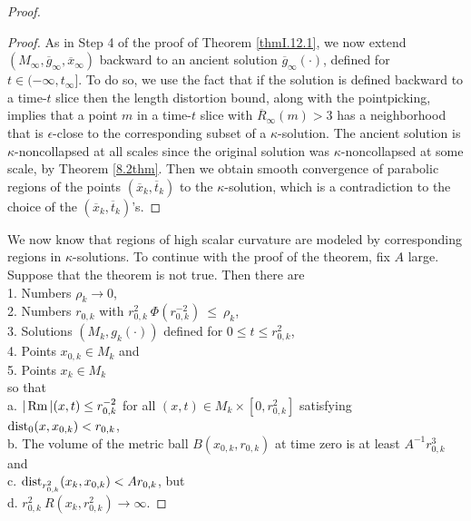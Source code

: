 \begin{proof}
\begin{proof}
As in Step 4 of the proof of Theorem \ref{thmI.12.1}, we now extend
$(M_\infty,
\overline{g}_\infty, \overline{x}_\infty)$ backward to an ancient solution
$\overline{g}_\infty(\cdot)$, defined for $t \in (-\infty, t_\infty]$.
To do so, we use the fact that if the solution
is defined backward to a time-$t$ slice then
the length distortion bound, along with the pointpicking,
implies that a point $m$ in a time-$t$ slice with $\overline{R}_\infty(m)
> 3$ has a neighborhood that is $\epsilon$-close to the corresponding
subset of a $\kappa$-solution. The ancient solution is $\kappa$-noncollapsed
at all scales since the original solution was $\kappa$-noncollapsed at
some scale, by Theorem \ref{8.2thm}.
Then we obtain smooth convergence
of parabolic regions of the points $(\overline{x}_k, \overline{t}_k)$ to
the $\kappa$-solution, which is a contradiction to the choice of the
$(\overline{x}_k, \overline{t}_k)$'s.
\end{proof}

We now know that regions of high scalar curvature are modeled by
corresponding
regions in $\kappa$-solutions. To continue with the proof of the theorem,
fix $A$ large.
Suppose that the theorem is not true.  Then there are \\
1. Numbers $\rho_k \rightarrow 0$, \\
2. Numbers $r_{0,k}$ with
$r_{0,k}^{2} \: \Phi(r_{0,k}^{-2}) \: \le \: \rho_k$,
\\
3. Solutions
$(M_k, g_k(\cdot))$ defined for $0 \le t \le r_{0,k}^2$, \\
4. Points $x_{0,k} \in M_k$ and \\
5. Points $x_k \in M_k$\\
so that \\
a. $|\operatorname{Rm}|(x, t) \le r_{0,k}^{-2}$ for
all $(x, t) \in M_k \times [0, r_{0,k}^2]$
satisfying $\operatorname{dist}_0(x, x_{0,k}) < r_{0,k}$, \\
b. The volume of the metric ball $B(x_{0,k}, r_{0,k})$ at
time zero is at least $A^{-1} r_{0,k}^3$ and \\
c.  $\operatorname{dist}_{r_{0,k}^2}(x_k, x_{0,k}) <
A r_{0,k}$, but \\
d. $r_{0,k}^2 \: R(x_k, r_{0,k}^2) \rightarrow \infty$.


\end{proof}
